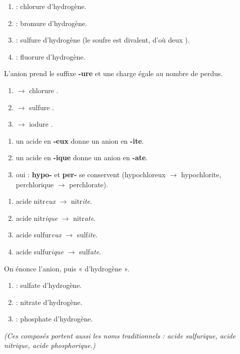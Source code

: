 \documentclass[11pt,a4paper]{article}
\begin{document}
\begin{corrige}
\begin{enumerate}[label=\alph*)]
  \item {} : chlorure d'hydrogène.
  \item {} : bromure d'hydrogène.
  \item {} : sulfure d'hydrogène (le soufre  est divalent, d'où deux ).
  \item {} : fluorure d'hydrogène.
\end{enumerate}
\end{corrige}

\begin{corrige}
L'anion prend le suffixe \textbf{-ure} et une charge égale au nombre de  perdus.
\begin{enumerate}[label=\alph*)]
  \item {} $\to$ chlorure .
  \item {} $\to$ sulfure .
  \item {} $\to$ iodure .
\end{enumerate}
\end{corrige}

\begin{corrige}
\begin{enumerate}[label=\alph*)]
  \item un acide en \textbf{-eux} donne un anion en \textbf{-ite}.
  \item un acide en \textbf{-ique} donne un anion en \textbf{-ate}.
  \item oui : \textbf{hypo-} et \textbf{per-} se conservent (hypochloreux $\to$ hypochlorite,
        perchlorique $\to$ perchlorate).
\end{enumerate}
\end{corrige}

\begin{corrige}
\begin{enumerate}[label=\alph*)]
  \item acide nitr\emph{eux} $\to$ nitr\emph{ite}.
  \item acide nitr\emph{ique} $\to$ nitr\emph{ate}.
  \item acide sulfur\emph{eux} $\to$ sulf\emph{ite}.
  \item acide sulfur\emph{ique} $\to$ sulf\emph{ate}.
\end{enumerate}
\end{corrige}

\begin{corrige}
On énonce l'anion, puis « d'hydrogène ».
\begin{enumerate}[label=\alph*)]
  \item {} : sulfate d'hydrogène.
  \item {} : nitrate d'hydrogène.
  \item {} : phosphate d'hydrogène.
\end{enumerate}
\emph{(Ces composés portent aussi les noms traditionnels : acide sulfurique, acide nitrique, acide phosphorique.)}
\end{corrige}
\end{document}
